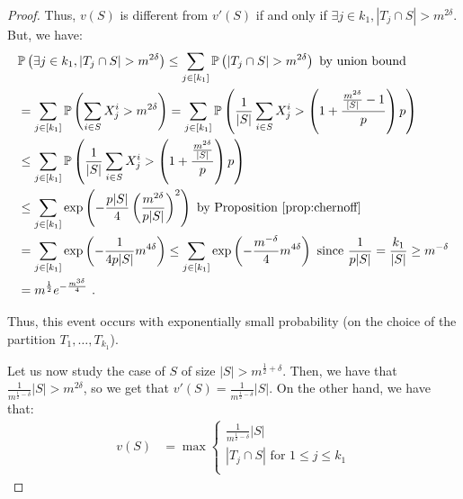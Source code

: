 \begin{proof}
    Thus, $v(S)$ is different from $v'(S)$ if and only if $\exists j \in k_1, |T_j \cap S| > m^{2\delta}$. But, we have:
    \begin{equation}
      \begin{aligned}
        &\mathbb{P}\left(\exists j \in k_1, |T_j \cap S| > m^{2\delta}\right) \leq \sum_{j \in [k_1]} \mathbb{P}\left(|T_j \cap S| > m^{2\delta}\right) \text{ by union bound}\\
        &=\sum_{j \in [k_1]} \mathbb{P}\left(\sum_{i \in S}X_j^i > m^{2\delta}\right)
        =\sum_{j \in [k_1]} \mathbb{P}\left(\frac{1}{|S|}\sum_{i \in S}X_j^i > \left(1 + \frac{\frac{m^{2\delta}}{[S|}-1}{p}\right)p \right)\\
        &\leq \sum_{j \in [k_1]} \mathbb{P}\left(\frac{1}{|S|}\sum_{i \in S}X_j^i > \left(1 + \frac{\frac{m^{2\delta}}{|S|}}{p}\right)p \right)\\
        &\leq \sum_{j \in [k_1]}\exp\left(-\frac{p|S|}{4}\left(\frac{m^{2\delta}}{p|S|}\right)^2\right) \text{ by Proposition~\ref{prop:chernoff}}\\
        &= \sum_{j \in [k_1]}\exp\left(-\frac{1}{4p|S|}m^{4\delta}\right) \leq \sum_{j \in [k_1]}\exp\left(-\frac{m^{-\delta}}{4}m^{4\delta}\right) \text{ since } \frac{1}{p|S|} = \frac{k_1}{|S|} \geq m^{-\delta}\\
        &= m^{\frac{1}{2}}e^{-\frac{m^{3\delta}}{4}}\ .
      \end{aligned}
    \end{equation}

    Thus, this event occurs with exponentially small probability (on the choice of the partition $T_1,\ldots,T_{k_1}$).

    Let us now study the case of $S$ of size $|S| > m^{\frac{1}{2}+\delta}$. Then, we have that $\frac{1}{m^{\frac{1}{2}-\delta}}|S| > m^{2\delta}$, so we get that $v'(S) = \frac{1}{m^{\frac{1}{2}-\delta}}|S|$. On the other hand, we have that:   
    \begin{equation}
    \begin{aligned}
      v(S) &= \max\begin{cases}
      \frac{1}{m^{\frac{1}{2}-\delta}}|S|\\
      |T_j \cap S| \text{ for } 1 \leq j \leq k_1\\
      \end{cases}
    \end{aligned}
    \end{equation}
    

\end{proof}
